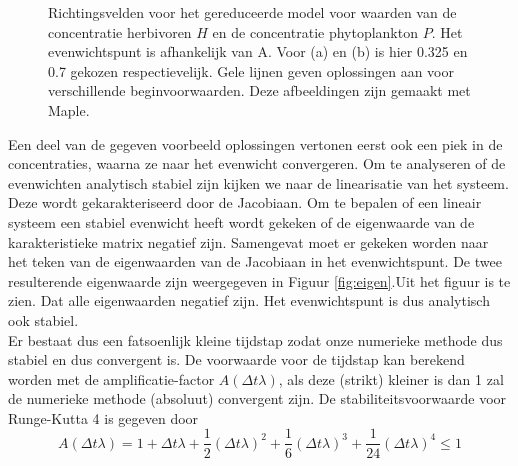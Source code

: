 \begin{figure}[H]
  \centering
  \hfill
  \caption{Richtingsvelden voor het gereduceerde model voor waarden van de concentratie herbivoren $H$ en de concentratie phytoplankton $P$. Het evenwichtspunt is afhankelijk van A. Voor (a) en (b) is hier 0.325 en 0.7 gekozen respectievelijk. Gele lijnen geven oplossingen aan voor verschillende beginvoorwaarden. Deze afbeeldingen zijn gemaakt met Maple.}
  \label{fig:phasePortrait}
\end{figure}
Een deel van de gegeven voorbeeld oplossingen vertonen eerst ook een piek in de concentraties, waarna ze naar het evenwicht convergeren. Om te analyseren of de evenwichten analytisch stabiel zijn kijken we naar de linearisatie van het systeem. Deze wordt gekarakteriseerd door de Jacobiaan. Om te bepalen of een lineair systeem een stabiel evenwicht heeft wordt gekeken of de eigenwaarde van de karakteristieke matrix negatief zijn. Samengevat moet er gekeken worden naar het teken van de eigenwaarden van de Jacobiaan in het evenwichtspunt. De twee resulterende eigenwaarde zijn weergegeven in Figuur \ref{fig:eigen}.Uit het figuur is te zien. Dat alle eigenwaarden negatief zijn. Het evenwichtspunt is dus analytisch ook stabiel. \\
Er bestaat dus een fatsoenlijk kleine tijdstap zodat onze numerieke methode dus stabiel en dus convergent is. De voorwaarde voor de tijdstap kan berekend worden met de amplificatie-factor $A(\Delta t \lambda)$, als deze (strikt) kleiner is dan 1 zal de numerieke methode (absoluut) convergent zijn. De stabiliteitsvoorwaarde voor Runge-Kutta 4 is gegeven door
\begin{equation}
    A(\Delta t \lambda)=1+\Delta t \lambda+\frac{1}{2}(\Delta t \lambda)^2+\frac{1}{6}(\Delta t \lambda)^3+\frac{1}{24}(\Delta t \lambda)^4 \leq 1
\end{equation}

